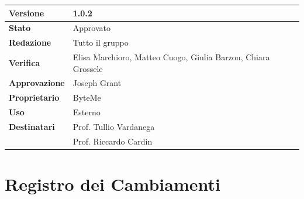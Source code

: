 \documentclass[11pt,a4paper]{article}
\begin{document}
\begin{titlepage}
    \begin{table}[H]
        \centering
        \begin{tabular}{|l|p{5cm}|}
            \hline
            \textbf{Versione} & 1.0.2 \\
            \hline
            \textbf{Stato} & Approvato \\
            \hline
            \textbf{Redazione} & Tutto il gruppo \\
            \hline
            \textbf{Verifica} & Elisa Marchioro, Matteo Cuogo, Giulia Barzon, Chiara Grossele \\
            \hline
            \textbf{Approvazione} & Joseph Grant \\
            \hline
            \textbf{Proprietario} & ByteMe \\
            \hline
            \textbf{Uso} & Esterno \\
            \hline
            \textbf{Destinatari} & Prof. Tullio Vardanega \\ & Prof. Riccardo Cardin \\
            \hline
        \end{tabular}
    \end{table}
    
    \vfill
\end{titlepage}

\thispagestyle{empty}
\section*{Registro dei Cambiamenti}
\end{document}
